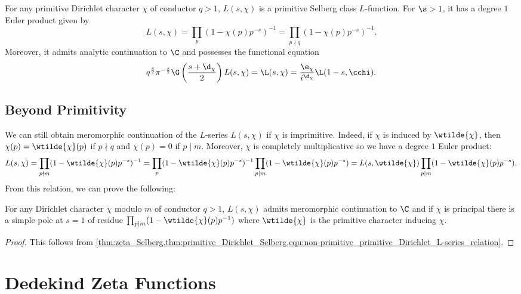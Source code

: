       \begin{theorem}\label{thm:primitive_Dirichlet_Selberg}
        For any primitive Dirichlet character $\chi$ of conductor $q > 1$, $L(s,\chi)$ is a primitive Selberg class $L$-function. For $\s > 1$, it has a degree $1$ Euler product given by
        \[
          L(s,\chi) = \prod_{p}(1-\chi(p)p^{-s})^{-1} = \prod_{p \nmid q}(1-\chi(p)p^{-s})^{-1}.
        \]
        Moreover, it admits analytic continuation to $\C$ and possesses the functional equation
        \[
          q^{\frac{s}{2}}\pi^{-\frac{s}{2}}\G\left(\frac{s+\d_{\chi}}{2}\right)L(s,\chi) = \L(s,\chi) = \frac{\e_{\chi}}{i^{\d_{\chi}}}\L(1-s,\cchi).
        \]
      \end{theorem}
    \subsection*{Beyond Primitivity}
      We can still obtain meromorphic continuation of the $L$-series $L(s,\chi)$ if $\chi$ is imprimitive. Indeed, if $\chi$ is induced by $\wtilde{\chi}$, then $\chi(p) = \wtilde{\chi}(p)$ if $p \nmid q$ and $\chi(p) = 0$ if $p \mid m$. Moreover, $\chi$ is completely multiplicative so we have a degree $1$ Euler product:
      \begin{equation}\label{equ:non-primitive_primitive_Dirichlet_L-series_relation}
        L(s,\chi) = \prod_{p \nmid m}(1-\wtilde{\chi}(p)p^{-s})^{-1} = \prod_{p}(1-\wtilde{\chi}(p)p^{-s})^{-1}\prod_{p \mid m}(1-\wtilde{\chi}(p)p^{-s}) = L(s,\wtilde{\chi})\prod_{p \mid m}(1-\wtilde{\chi}(p)p^{-s}).
      \end{equation}
      From this relation, we can prove the following:

      \begin{theorem}\label{thm:analytic_continuation_Dirichlet}
        For any Dirichlet character $\chi$ modulo $m$ of conductor $q > 1$, $L(s,\chi)$ admits meromorphic continuation to $\C$ and if $\chi$ is principal there is a simple pole at $s = 1$ of residue $\prod_{p \mid m}(1-\wtilde{\chi}(p)p^{-1})$ where $\wtilde{\chi}$ is the primitive character inducing $\chi$.
      \end{theorem}
      \begin{proof}
        This follows from \cref{thm:zeta_Selberg,thm:primitive_Dirichlet_Selberg,equ:non-primitive_primitive_Dirichlet_L-series_relation}. 
      \end{proof}
  \section{Dedekind Zeta Functions}
